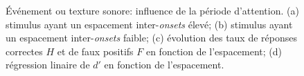 \begin{figure}[t]
        \myfloatalign
         \par
        \caption[Événement ou texture sonore: influence de la période d'attention.]{Événement ou texture sonore: influence de la période d'attention. (a) stimulus ayant un espacement inter-\emph{onsets} élevé; (b) stimulus ayant un espacement inter-\emph{onsets} faible; (c) évolution des taux de réponses correctes $H$ et de faux positifs $F$ en fonction de l'espacement; (d) régression linaire de $d'$ en fonction de l'espacement.}\label{fig:xptexture}
\end{figure}

